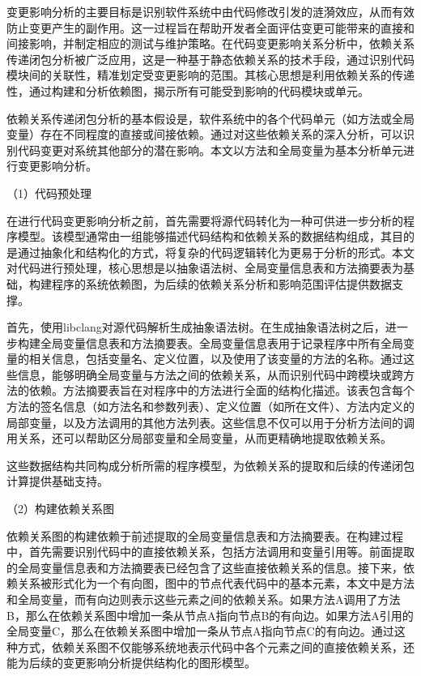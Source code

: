 变更影响分析的主要目标是识别软件系统中由代码修改引发的涟漪效应，从而有效防止变更产生的副作用。这一过程旨在帮助开发者全面评估变更可能带来的直接和间接影响，并制定相应的测试与维护策略。在代码变更影响关系分析中，依赖关系传递闭包分析被广泛应用，这是一种基于静态依赖关系的技术手段，通过识别代码模块间的关联性，精准划定受变更影响的范围\cite{2021Improving}。其核心思想是利用依赖关系的传递性，通过构建和分析依赖图，揭示所有可能受到影响的代码模块或单元。

依赖关系传递闭包分析的基本假设是，软件系统中的各个代码单元（如方法或全局变量）存在不同程度的直接或间接依赖。通过对这些依赖关系的深入分析，可以识别代码变更对系统其他部分的潜在影响。本文以方法和全局变量为基本分析单元进行变更影响分析。

（1）代码预处理

在进行代码变更影响分析之前，首先需要将源代码转化为一种可供进一步分析的程序模型。该模型通常由一组能够描述代码结构和依赖关系的数据结构组成，其目的是通过抽象化和结构化的方式，将复杂的代码逻辑转化为更易于分析的形式。本文对代码进行预处理，核心思想是以抽象语法树、全局变量信息表和方法摘要表为基础，构建程序的系统依赖图，为后续的依赖关系分析和影响范围评估提供数据支撑。

首先，使用libclang对源代码解析生成抽象语法树。在生成抽象语法树之后，进一步构建全局变量信息表和方法摘要表。全局变量信息表用于记录程序中所有全局变量的相关信息，包括变量名、定义位置，以及使用了该变量的方法的名称。通过这些信息，能够明确全局变量与方法之间的依赖关系，从而识别代码中跨模块或跨方法的依赖。方法摘要表旨在对程序中的方法进行全面的结构化描述。该表包含每个方法的签名信息（如方法名和参数列表）、定义位置（如所在文件）、方法内定义的局部变量，以及方法调用的其他方法列表。这些信息不仅可以用于分析方法间的调用关系，还可以帮助区分局部变量和全局变量，从而更精确地提取依赖关系。

这些数据结构共同构成分析所需的程序模型，为依赖关系的提取和后续的传递闭包计算提供基础支持。

（2）构建依赖关系图

依赖关系图的构建依赖于前述提取的全局变量信息表和方法摘要表。在构建过程中，首先需要识别代码中的直接依赖关系，包括方法调用和变量引用等。前面提取的全局变量信息表和方法摘要表已经包含了这些直接依赖关系的信息。接下来，依赖关系被形式化为一个有向图，图中的节点代表代码中的基本元素，本文中是方法和全局变量，而有向边则表示这些元素之间的依赖关系。如果方法A调用了方法B，那么在依赖关系图中增加一条从节点A指向节点B的有向边。如果方法A引用的全局变量C，那么在依赖关系图中增加一条从节点A指向节点C的有向边。通过这种方式，依赖关系图不仅能够系统地表示代码中各个元素之间的直接依赖关系，还能为后续的变更影响分析提供结构化的图形模型。

